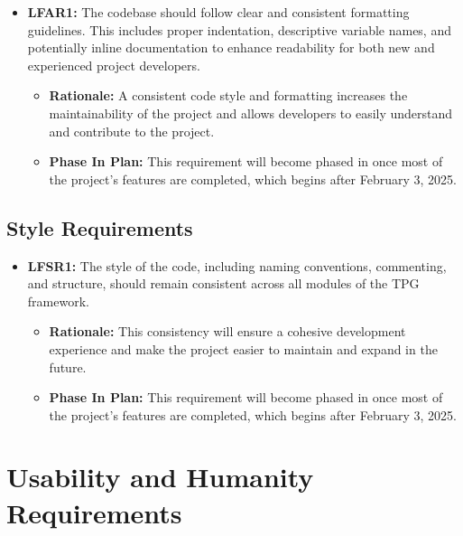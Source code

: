 \documentclass[12pt]{article}
\begin{document}
\begin{itemize}
  \item \label{LFAR1} \textbf{LFAR1:}  The codebase should follow clear and consistent formatting guidelines. This includes proper indentation, descriptive variable names, and potentially inline documentation to enhance readability for both new and experienced project developers.
      \begin{itemize}
        \item \textbf{Rationale:} A consistent code style and formatting increases the maintainability of the project and allows developers to easily understand and contribute to the project. 
        \item \textbf{Phase In Plan:} This requirement will become phased in once most of the project’s features are completed, which begins after February 3, 2025. 

      \end{itemize}
\end{itemize}


\subsection{Style Requirements}


\begin{itemize}
  \item \label{LFSR1} \textbf{LFSR1:}  The style of the code, including naming conventions, commenting, and structure, should remain consistent across all modules of the TPG framework.

      \begin{itemize}
        \item \textbf{Rationale:} This consistency will ensure a cohesive development experience and make the project easier to maintain and expand in the future.
        \item \textbf{Phase In Plan:} This requirement will become phased in once most of the project’s features are completed, which begins after February 3, 2025. 

      \end{itemize}
\end{itemize}


\section{Usability and Humanity Requirements}
\end{document}
